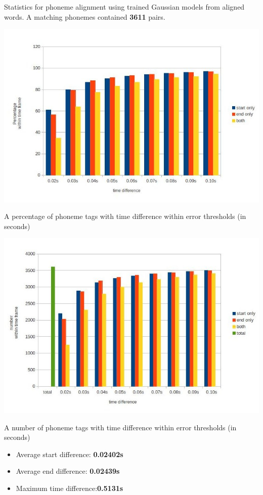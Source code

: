 \documentclass[12pt,a4paper,english]{article}
\begin{document}
Statistics for phoneme alignment using trained Gaussian models from aligned words.
A matching phonemes contained \textbf{3611} pairs.
\begin{center}
    \includegraphics[scale=0.47]{corpora_phoneme_trained_results.jpg}
    \caption[]{A percentage of phoneme tags with time difference within error thresholds (in seconds)}
\end{center}
\begin{center}
    \includegraphics[scale=0.47]{corpora_phoneme_trained_counts.jpg}
    \caption[]{A number of phoneme tags with time difference within error thresholds (in seconds)}
\end{center}
\begin{itemize}
    \item Average start difference: \textbf{0.02402s}
    \item Average end difference: \textbf{0.02439s}
    \item Maximum time difference:\textbf{0.5131s}
\end{itemize}
\end{document}
